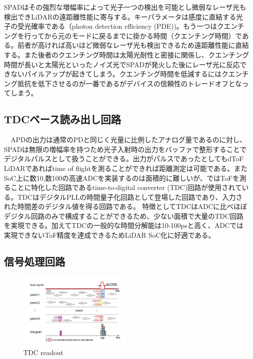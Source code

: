 \documentclass[twocolumn, 11pt, a4j]{article}
\begin{document}
SPADはその強烈な増幅率によって光子一つの検出を可能とし微弱なレーザ光も検出できLiDARの遠距離性能に寄与する。キーパラメータは感度に直結する光子の受光確率である（photon detection efficiency (PDE))。もう一つはクエンチングを行ってから元のモードに戻るまでに掛かる時間（クエンチング時間）である。前者が高ければ高いほど微弱なレーザ光も検出できるため遠距離性能に直結する。また後者のクエンチング時間は太陽光耐性と密接に関係し、クエンチング時間が長いと太陽光といったノイズ光でSPADが発火した後にレーザ光に反応できないパイルアップが起きてしまう。クエンチング時間を低減するにはクエンチング抵抗を低下させるのが一番であるがデバイスの信頼性のトレードオフとなってしまう。%

\subsection{TDCベース読み出し回路}
　APDの出力は通常のPDと同じく光量に比例したアナログ量であるのに対し、SPADは無限の増幅率を持つため光子入射時の出力をバッファで整形することでデジタルパルスとして扱うことができる。出力がパルスであったとしてもdToF LiDARであればtime of flightを測ることができれば距離測定は可能である。またSoC上に数10,数100の高速ADCを実装するのは面積的に難しいが、\cite{niclass2012100}ではToFを測ることに特化した回路であるtime-to-digital converter (TDC)回路が使用されている。TDCはデジタルPLLの時間量子化回路として登場した回路であり、入力された時間差のデジタル値を得る回路である\cite{leetdc, elkholytdc}。
特徴としてTDCはADCに比べほぼデジタル回路のみで構成することができるため、少ない面積で大量のTDC回路を実現できる。加えてTDCの一般的な時間分解能は10-100psと高く、ADCでは実現できないToF精度を達成できるためLiDAR SoC化に好適である。

\subsection{信号処理回路}
\begin{figure}[!t]
\centering
 \includegraphics[width=0.5\textwidth]{figs/threshold.png}
  \caption{TDC readout \cite{niclass2012100}}
\label{tdc}
\end{figure}
\end{document}
